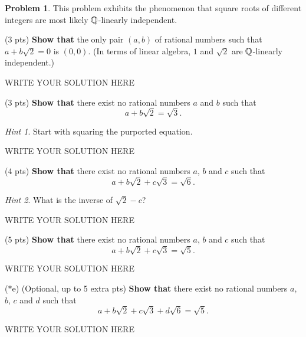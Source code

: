 \documentclass[11pt]{article}
\theoremstyle{plain}
\theoremstyle{definition}
\newtheorem{problem}{Problem}
\theoremstyle{remark}
\newtheorem*{hint}{Hint}
\numberwithin{equation}{problem}
\begin{document}
\begin{problem}
	This problem exhibits the phenomenon that square roots of different integers are most likely $\mathbb{Q}$-linearly independent.

	\begin{listinprob}
		\item (3 pts) \textbf{Show that} the only pair $(a,b)$ of rational numbers such that $a+b\sqrt{2}=0$ is $(0,0)$. (In terms of linear algebra, $1$ and $\sqrt{2}$ are $\mathbb{Q}$-linearly independent.)
\begin{solution} %
WRITE YOUR SOLUTION HERE
\end{solution}\clearpage %
		\item (3 pts) \textbf{Show that} there exist no rational numbers $a$ and $b$ such that 
		\[
			a+b\sqrt{2} = \sqrt{3}.
		\]
		\begin{hint}
			Start with squaring the purported equation.
		\end{hint}
\begin{solution} %
WRITE YOUR SOLUTION HERE
\end{solution}\clearpage %
		\item (4 pts) \textbf{Show that} there exist no rational numbers $a$, $b$ and $c$ such that
		\[
			a+b\sqrt{2}+c\sqrt{3}=\sqrt{6}.
		\]
		\begin{hint}
			What is the inverse of $\sqrt{2}-c$?
		\end{hint}
\begin{solution} %
WRITE YOUR SOLUTION HERE
\end{solution}\clearpage %
		\item (5 pts) \textbf{Show that} there exist no rational numbers $a$, $b$ and $c$ such that
		\[
			a+b\sqrt{2}+c\sqrt{3}=\sqrt{5}.
		\]		
\begin{solution} %
WRITE YOUR SOLUTION HERE
\end{solution}\clearpage %
		\item[($\ast$e)] (Optional, up to 5 extra pts) \textbf{Show that} there exist no rational numbers $a$, $b$, $c$ and $d$ such that
		\[
			a+b\sqrt{2}+c\sqrt{3}+d\sqrt{6}=\sqrt{5}.
		\]		
	\end{listinprob}
\end{problem}
\begin{solution} %
WRITE YOUR SOLUTION HERE
\end{solution}\clearpage %
\end{document}
